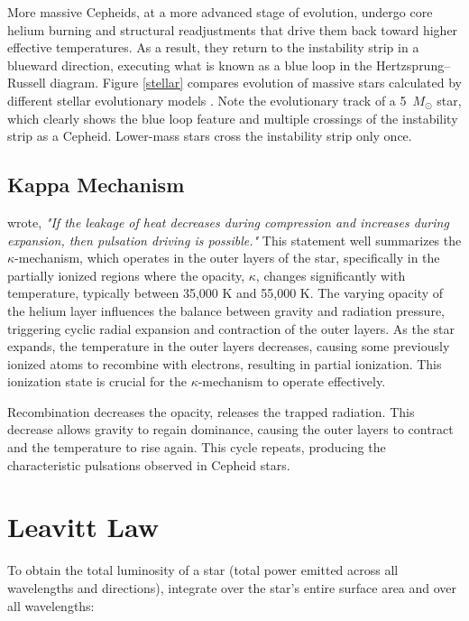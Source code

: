 


More massive Cepheids, at a more advanced stage of evolution, undergo core helium burning and structural readjustments that drive them back toward higher effective temperatures. As a result, they return to the instability strip in a blueward direction, executing what is known as a blue loop in the Hertzsprung--Russell diagram. Figure \ref{stellar} compares evolution of massive stars calculated by different stellar evolutionary models \citep{2014anderson}. Note the evolutionary track of a 5~$M_\odot$ star, which clearly shows the blue loop feature and multiple crossings of the instability strip as a Cepheid. Lower-mass stars cross the instability strip only once.

\subsection{Kappa Mechanism}

\cite{1998noels} wrote, \textit{"If the leakage of heat decreases during compression and increases during expansion, then pulsation driving is possible."} This statement well summarizes the $\kappa$-mechanism, which operates in the outer layers of the star, specifically in the partially ionized regions where the opacity, $\kappa$, changes significantly with temperature, typically between 35,000 K and 55,000 K. The varying opacity of the helium layer influences the balance between gravity and radiation pressure, triggering cyclic radial expansion and contraction of the outer layers. As the star expands, the temperature in the outer layers decreases, causing some previously ionized atoms to recombine with electrons, resulting in partial ionization. This ionization state is crucial for the $\kappa$-mechanism to operate effectively.

Recombination decreases the opacity, releases the trapped radiation. This decrease allows gravity to regain dominance, causing the outer layers to contract and the temperature to rise again. This cycle repeats, producing the characteristic pulsations observed in Cepheid stars. 




\section{Leavitt Law}

To obtain the total luminosity of a star (total power emitted across all wavelengths and directions), integrate over the star's entire surface area and over all wavelengths:


